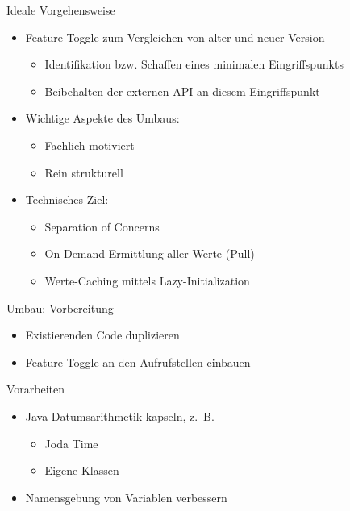 \begin{frame}[fragile]{Ideale Vorgehensweise}
\begin{itemize}
\item Feature-Toggle zum Vergleichen von alter und neuer Version
\begin{itemize}
\item Identifikation bzw. Schaffen eines minimalen Eingriffspunkts
\item Beibehalten der externen API an diesem Eingriffspunkt
\end{itemize}
\end{itemize}

\begin{itemize}
\item Wichtige Aspekte des Umbaus:
\begin{itemize}
\item Fachlich motiviert
\item Rein strukturell
\end{itemize}
\end{itemize}

\begin{itemize}
\item Technisches Ziel:
\begin{itemize}
\item Separation of Concerns
\item On-Demand-Ermittlung aller Werte (\glqq Pull\grqq{})
\item Werte-Caching mittels Lazy-Initialization
\end{itemize}

\end{itemize}
\end{frame}



\begin{frame}[fragile]{Umbau: Vorbereitung}
\begin{itemize}
\item Existierenden Code duplizieren
\item Feature Toggle an den Aufrufstellen einbauen
\end{itemize}
\end{frame}
 
\begin{frame}[fragile]{Vorarbeiten}
\begin{itemize}
\item Java-Datumsarithmetik kapseln, z.~B.
\begin{itemize}
\item Joda Time
\item Eigene Klassen
\end{itemize}
\end{itemize}

\begin{itemize}
\item Namensgebung von Variablen verbessern
\end{itemize}
\end{frame}

